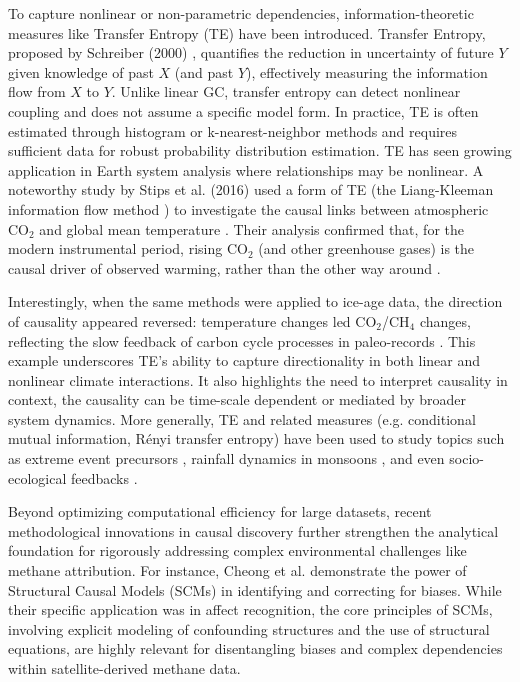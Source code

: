 To capture nonlinear or non-parametric dependencies, information-theoretic measures like Transfer Entropy (TE) have been introduced. Transfer Entropy, proposed by Schreiber (2000) \cite{Schreiber2000}, quantifies the reduction in uncertainty of future $Y$ given knowledge of past $X$ (and past $Y$), effectively measuring the information flow from $X$ to $Y$. Unlike linear GC, transfer entropy can detect nonlinear coupling and does not assume a specific model form. In practice, TE is often estimated through histogram or k-nearest-neighbor methods and requires sufficient data for robust probability distribution estimation. TE has seen growing application in Earth system analysis where relationships may be nonlinear. A noteworthy study by Stips et al. (2016) \cite{Stips2016} used a form of TE (the Liang-Kleeman information flow method \cite{LianKleeman2013}) to investigate the causal links between atmospheric CO$_2$ and global mean temperature \cite{Stips2016}. Their analysis confirmed that, for the modern instrumental period, rising CO$_2$ (and other greenhouse gases) is the causal driver of observed warming, rather than the other way around \cite{Larsson2023}. 

Interestingly, when the same methods were applied to ice-age data, the direction of causality appeared reversed: temperature changes led CO$_2$/CH$_4$ changes, reflecting the slow feedback of carbon cycle processes in paleo-records \cite{Larsson2023}. This example underscores TE's ability to capture directionality in both linear and nonlinear climate interactions. It also highlights the need to interpret causality in context, the causality can be time-scale dependent or mediated by broader system dynamics. More generally, TE and related measures (e.g. conditional mutual information, Rényi transfer entropy) have been used to study topics such as extreme event precursors \cite{Palus2024, Benocci2025}, rainfall dynamics in monsoons \cite{tongal_forecasting_2021}, and even socio-ecological feedbacks \cite{li_integrating_2025}. 

Beyond optimizing computational efficiency for large datasets, recent methodological innovations in causal discovery further strengthen the analytical foundation for rigorously addressing complex environmental challenges like methane attribution. For instance, Cheong et al. \cite{cheong2021causal} demonstrate the power of Structural Causal Models (SCMs) in identifying and correcting for biases. While their specific application was in affect recognition, the core principles of SCMs, involving explicit modeling of confounding structures and the use of structural equations, are highly relevant for disentangling biases and complex dependencies within satellite-derived methane data. 

